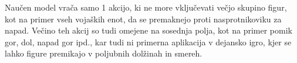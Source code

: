 \documentclass[a4paper, 12pt]{book}
\begin{document}
Naučen model vrača samo 1 akcijo, ki ne more vključevati večjo skupino figur, kot na primer vseh vojaških enot, da se premaknejo proti nasprotnikoviku za napad.
Večino teh akcij so tudi omejene na sosednja polja, kot na primer pomik gor, dol, napad gor ipd., kar tudi ni primerna aplikacija v dejansko igro, kjer se lahko figure premikajo v poljubnih dolžinah in smereh.
\end{document}
